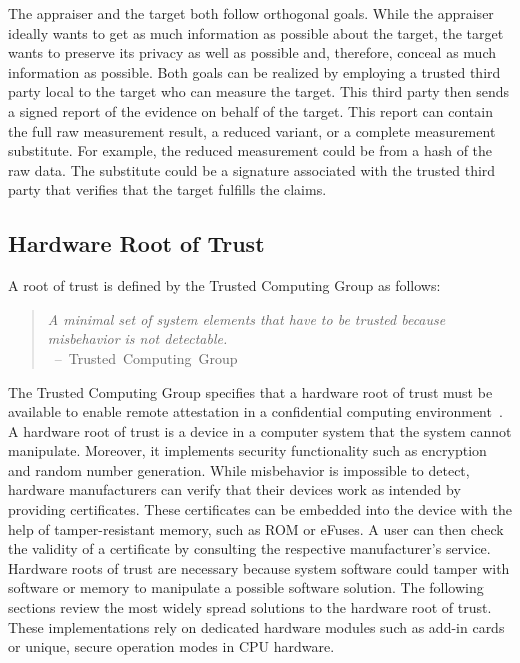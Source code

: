 The appraiser and the target both follow orthogonal goals. While the appraiser
ideally wants to get as much information as possible about the target, the
target wants to preserve its privacy as well as possible and, therefore, conceal
as much information as possible. Both goals can be realized by employing a
trusted third party local to the target who can measure the target. This
third party then sends a signed report of the evidence on behalf of the
target. This report can contain the full raw measurement result, a reduced
variant, or a complete measurement substitute. For example, the reduced
measurement could be from a hash of the raw data. The substitute could be a
signature associated with the trusted third party that verifies that the target
fulfills the claims.

\subsection{Hardware Root of Trust}
\label{sec:20:hardware_root_of_trust}
A root of trust is defined by the Trusted Computing Group as follows:
\begin{quote}
  \textit{ A minimal set of system elements that have to be trusted because
    misbehavior is not detectable. \\
  } \mbox{ -- Trusted Computing Group~\cite{tpm_architecture}}
\end{quote}

The Trusted Computing Group specifies that a hardware root of trust must be
available to enable remote attestation in a confidential computing
environment~\cite{tpm_architecture}. A hardware root of trust is a device in a
computer system that the system cannot manipulate. Moreover, it implements
security functionality such as encryption and random number generation. While
misbehavior is impossible to detect, hardware manufacturers can verify that
their devices work as intended by providing certificates. These certificates can
be embedded into the device with the help of tamper-resistant memory, such as
ROM or eFuses. A user can then check the validity of a certificate by consulting
the respective manufacturer's service. \\

Hardware roots of trust are necessary because system software could tamper with
software or memory to manipulate a possible software solution. The following
sections review the most widely spread solutions to the hardware root of
trust. These implementations rely on dedicated hardware modules such as add-in
cards or unique, secure operation modes in CPU hardware. \\

